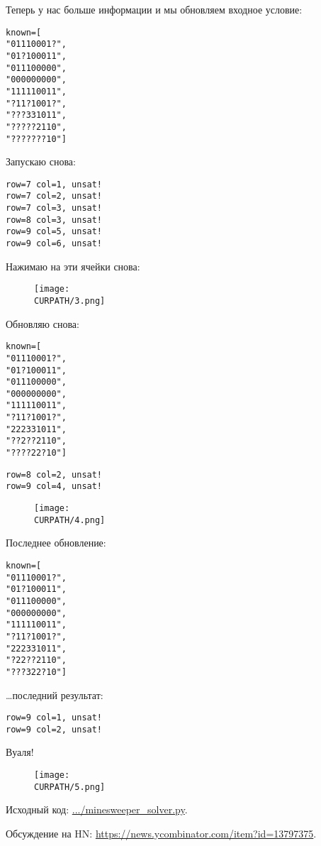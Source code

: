 Теперь у нас больше информации и мы обновляем входное условие:

\begin{lstlisting}
known=[
"01110001?",
"01?100011",
"011100000",
"000000000",
"111110011",
"?11?1001?",
"???331011",
"?????2110",
"???????10"]
\end{lstlisting}

Запускаю снова:

\begin{lstlisting}
row=7 col=1, unsat!
row=7 col=2, unsat!
row=7 col=3, unsat!
row=8 col=3, unsat!
row=9 col=5, unsat!
row=9 col=6, unsat!
\end{lstlisting}

Нажимаю на эти ячейки снова:

\begin{figure}[H]
\centering
\texttt{[image: \\CURPATH/3.png]}
\end{figure}

Обновляю снова:

\begin{lstlisting}
known=[
"01110001?",
"01?100011",
"011100000",
"000000000",
"111110011",
"?11?1001?",
"222331011",
"??2??2110",
"????22?10"]
\end{lstlisting}

\begin{lstlisting}
row=8 col=2, unsat!
row=9 col=4, unsat!
\end{lstlisting}

\begin{figure}[H]
\centering
\texttt{[image: \\CURPATH/4.png]}
\end{figure}

Последнее обновление:

\begin{lstlisting}
known=[
"01110001?",
"01?100011",
"011100000",
"000000000",
"111110011",
"?11?1001?",
"222331011",
"?22??2110",
"???322?10"]
\end{lstlisting}

\dots последний результат:

\begin{lstlisting}
row=9 col=1, unsat!
row=9 col=2, unsat!
\end{lstlisting}

Вуаля!

\begin{figure}[H]
\centering
\texttt{[image: \\CURPATH/5.png]}
\end{figure}

Исходный код: \url{.../minesweeper_solver.py}.

Обсуждение на HN: \url{https://news.ycombinator.com/item?id=13797375}.

